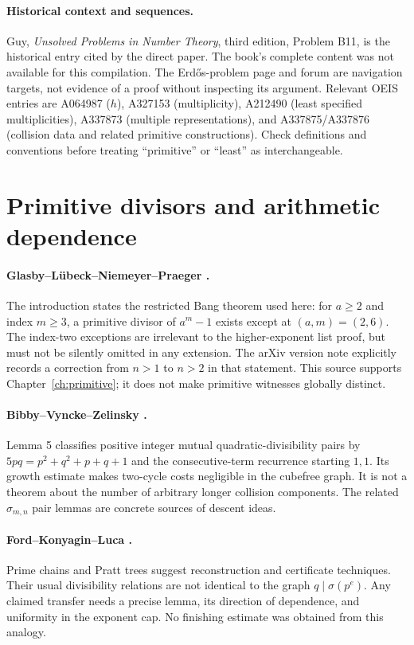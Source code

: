 \paragraph{Historical context and sequences.}
Guy, \emph{Unsolved Problems in Number Theory}, third edition, Problem B11,
is the historical entry cited by the direct paper. The book's complete content
was not available for this compilation. The Erd\H{o}s-problem page and forum
are navigation targets, not evidence of a proof without inspecting its argument.
Relevant OEIS entries are A064987 ($h$), A327153 (multiplicity), A212490 (least
specified multiplicities), A337873 (multiple representations), and A337875/A337876
(collision data and related primitive constructions). Check definitions and
conventions before treating ``primitive'' or ``least'' as interchangeable.

\section{Primitive divisors and arithmetic dependence}
\paragraph{Glasby--L\"ubeck--Niemeyer--Praeger \cite{zsig}.}
The introduction states the restricted Bang theorem used here: for $a\ge2$
and index $m\ge3$, a primitive divisor of $a^m-1$ exists except at $(a,m)=(2,6)$.
The index-two exceptions are irrelevant to the higher-exponent list proof, but
must not be silently omitted in any extension. The arXiv version note explicitly
records a correction from $n>1$ to $n>2$ in that statement. This source supports
Chapter~\ref{ch:primitive}; it does not make primitive witnesses globally distinct.

\paragraph{Bibby--Vyncke--Zelinsky \cite{bibby}.}
Lemma 5 classifies positive integer mutual quadratic-divisibility pairs by
$5pq=p^2+q^2+p+q+1$ and the consecutive-term recurrence starting $1,1$.
Its growth estimate makes two-cycle costs negligible in the cubefree graph.
It is not a theorem about the number of arbitrary longer collision components.
The related $\sigma_{m,n}$ pair lemmas are concrete sources of descent ideas.

\paragraph{Ford--Konyagin--Luca \cite{pratt}.}
Prime chains and Pratt trees suggest reconstruction and certificate techniques.
Their usual divisibility relations are not identical to the graph
$q\mid\sigma(p^e)$. Any claimed transfer needs a precise lemma, its direction
of dependence, and uniformity in the exponent cap. No finishing estimate was
obtained from this analogy.

